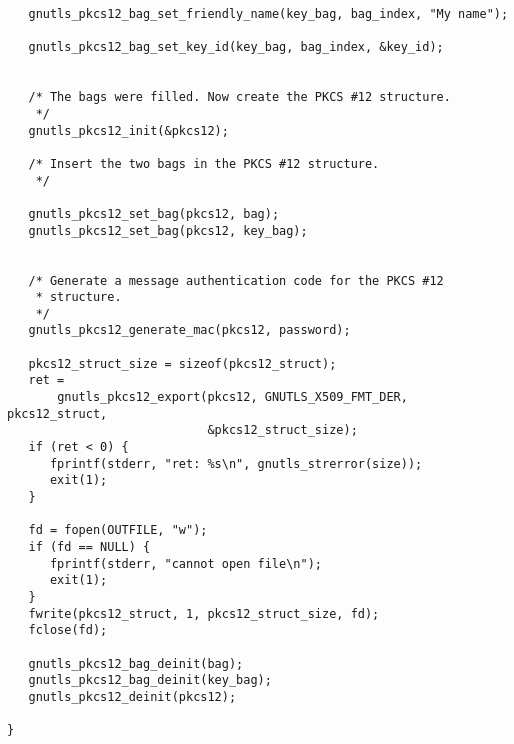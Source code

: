 \begin{verbatim}
   gnutls_pkcs12_bag_set_friendly_name(key_bag, bag_index, "My name");

   gnutls_pkcs12_bag_set_key_id(key_bag, bag_index, &key_id);


   /* The bags were filled. Now create the PKCS #12 structure.
    */
   gnutls_pkcs12_init(&pkcs12);

   /* Insert the two bags in the PKCS #12 structure.
    */

   gnutls_pkcs12_set_bag(pkcs12, bag);
   gnutls_pkcs12_set_bag(pkcs12, key_bag);


   /* Generate a message authentication code for the PKCS #12
    * structure.
    */
   gnutls_pkcs12_generate_mac(pkcs12, password);

   pkcs12_struct_size = sizeof(pkcs12_struct);
   ret =
       gnutls_pkcs12_export(pkcs12, GNUTLS_X509_FMT_DER, pkcs12_struct,
                            &pkcs12_struct_size);
   if (ret < 0) {
      fprintf(stderr, "ret: %s\n", gnutls_strerror(size));
      exit(1);
   }

   fd = fopen(OUTFILE, "w");
   if (fd == NULL) {
      fprintf(stderr, "cannot open file\n");
      exit(1);
   }
   fwrite(pkcs12_struct, 1, pkcs12_struct_size, fd);
   fclose(fd);

   gnutls_pkcs12_bag_deinit(bag);
   gnutls_pkcs12_bag_deinit(key_bag);
   gnutls_pkcs12_deinit(pkcs12);

}

\end{verbatim}
